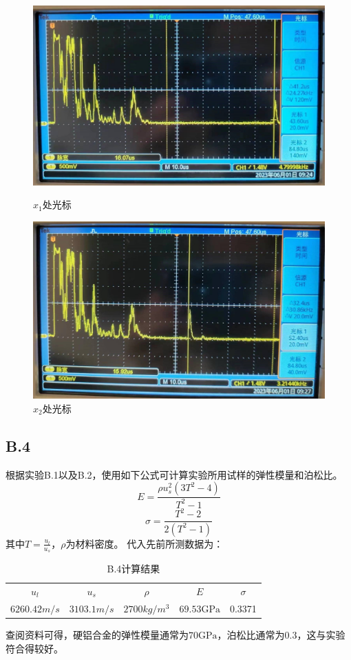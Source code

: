 \documentclass[UTF8,a4paper]{article}%
\begin{document}
\begin{figure}[H] %
    \centering
    \begin{minipage}[t]{0.5\linewidth}
        \centering
        \includegraphics[width=0.95\linewidth]{B3-1.jpg}
        \caption{$x_1$处光标}
        \label{fg:b3-1}
    \end{minipage}%
    \begin{minipage}[t]{0.5\linewidth}
        \centering
        \includegraphics[width=0.95\linewidth]{B3-2.jpg}
        \caption{$x_2$处光标}
        \label{fg:b3-2}
    \end{minipage}
\end{figure}
\subsection*{B.4}
根据实验B.1以及B.2，使用如下公式可计算实验所用试样的弹性模量和泊松比。
$$E=\frac{\rho u_s^2(3T^2-4)}{T^2-1}$$
$$\sigma=\frac{T^2-2}{2(T^2-1)}$$
其中$T=\frac{u_l}{u_s}$，$\rho$为材料密度。
代入先前所测数据为：
\begin{table}[H]
    \centering
    \caption{B.4计算结果}
    \label{tab:b4}
    \begin{tabular}{ccccc}
        \hline
        $u_l$               & $u_s$              & $\rho$              & $E$                & $\sigma$ \\
        $6260.42\unit{m/s}$ & $3103.1\unit{m/s}$ & $2700\unit{kg/m^3}$ & $69.53\unit{\GPa}$ & 0.3371   \\ \hline
    \end{tabular}
\end{table}
查阅资料可得，硬铝合金的弹性模量通常为$70\unit{\GPa}$，泊松比通常为0.3，这与实验符合得较好。
\end{document}
